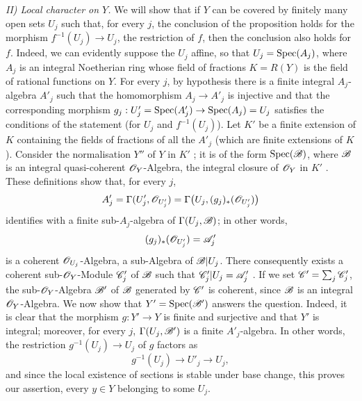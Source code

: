\emph{II) Local character on $Y$.}
We will show that if $Y$ can be covered by finitely many open sets $U_j$ such that, for every $j$, the conclusion of the proposition holds for the morphism $f^{-1}(U_j)\to U_j$, the restriction of $f$, then the conclusion also holds for $f$.
Indeed, we can evidently suppose the $U_j$ affine, so that $U_j=\operatorname{Spec}(A_j)$, where $A_j$ is an integral Noetherian ring whose field of fractions $K=R(Y)$ is the field of rational functions on $Y$.
For every $j$, by hypothesis there is a finite integral $A_j$-algebra $A'_j$ such that the homomorphism $A_j\to A'_j$ is injective  and that the corresponding morphism $g_j:U'_j=\operatorname{Spec}(A'_j)\to\operatorname{Spec}(A_j)=U_j$ satisfies the conditions of the statement (for $U_j$ and $f^{-1}(U_j)$).
Let $K'$ be a finite extension of $K$ containing the fields of fractions of all the $A'_j$ (which are finite extensions of $K$).
Consider the normalisation $Y''$ of $Y$ in $K'$ ; it is of the form $\operatorname{Spec}(\mathscr{B})$, where $\mathscr{B}$ is an integral quasi-coherent $\mathscr{O}_Y$-Algebra, the integral closure of $\mathscr{O}_Y$ in $K'$ .
These definitions show that, for every $j$,
\[
 A'_j=\Gamma(U'_j,\mathscr{O}_{U'_j})
     =\Gamma\bigl(U_j,(g_j)_*(\mathscr{O}_{U'_j})\bigr)
\]
identifies with a finite sub-$A_j$-algebra of $\Gamma(U_j,\mathscr{B})$; in other words,
\[
 (g_j)_*(\mathscr{O}_{U'_j})=\mathscr{A}'_j
\]
is a coherent $\mathscr{O}_{U_j}$-Algebra, a sub-Algebra of $\mathscr{B}|U_j$.
There consequently exists a coherent sub-$\mathscr{O}_Y$-Module $\mathscr{C}'_j$ of $\mathscr{B}$ such that $\mathscr{C}'_j|U_j=\mathscr{A}'_j$ .
If we set $\mathscr{C}'=\sum_j\mathscr{C}'_j$, the sub-$\mathscr{O}_Y$-Algebra $\mathscr{B}'$ of $\mathscr{B}$ generated by $\mathscr{C}'$ is coherent, since $\mathscr{B}$ is an integral $\mathscr{O}_Y$-Algebra.
We now show that $Y'=\operatorname{Spec}(\mathscr{B}')$ answers the question.
Indeed, it is clear that the morphism $g:Y'\to Y$ is finite and surjective and that $Y'$ is integral; moreover, for every $j$, $\Gamma(U_j,\mathscr{B}')$ is a finite $A'_j$-algebra.
In other words, the restriction $g^{-1}(U_j)\to U_j$ of $g$ factors as
\[
 g^{-1}(U_j)\longrightarrow U'_j\longrightarrow U_j,
\]
and since the local existence of sections is stable under base change, this proves our assertion, every $y\in Y$ belonging to some $U_j$.

